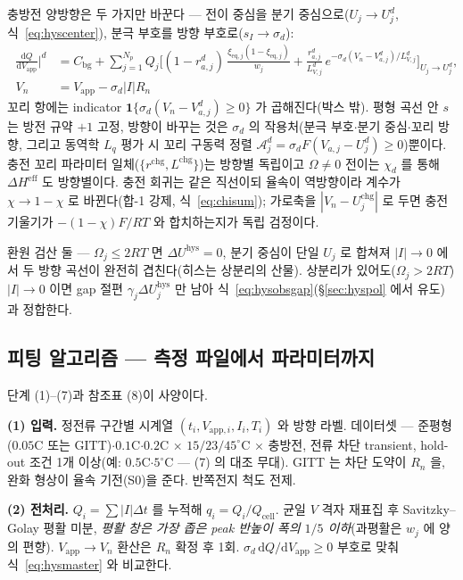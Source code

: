 \documentclass[11pt,a4paper]{article}
\newcommand{\dd}{\mathrm{d}}
\newcommand{\eff}{\mathrm{eff}}
\newcommand{\eq}{\mathrm{eq}}
\newcommand{\app}{\mathrm{app}}
\newcommand{\cell}{\mathrm{cell}}
\newcommand{\bg}{\mathrm{bg}}
\newcommand{\chg}{\mathrm{chg}}
\newcommand{\hys}{\mathrm{hys}}
\begin{document}
충방전 양방향은 두 가지만 바꾼다 — 전이 중심을 분기 중심으로($U_j\to U_j^{d}$, 식~\eqref{eq:hyscenter}), 분극 부호를 방향 부호로($s_I\to\sigma_d$):
\begin{equation}
\boxed{\;\begin{aligned}\frac{\dd Q}{\dd V_\app}\Big|^{d}&=C_\bg+\sum_{j=1}^{N_p}Q_j\bigg[
(1-r_{a,j}^d)\,\frac{\xi_{\eq,j}(1-\xi_{\eq,j})}{w_j}
+\frac{r_{a,j}^d}{L_{V,j}^d}\,e^{-\sigma_d(V_n-V_{a,j}^d)/L_{V,j}^d}\bigg]_{U_j\to U_j^{d}},\\[2pt]
V_n&=V_\app-\sigma_d|I|R_n\end{aligned}\;}
\label{eq:hysmaster}
\end{equation}
꼬리 항에는 indicator $\mathbf 1\{\sigma_d(V_n-V_{a,j}^d)\ge0\}$ 가 곱해진다(박스 밖). 평형 곡선 안 $s$ 는 방전 규약 $+1$ 고정, 방향이 바꾸는 것은 $\sigma_d$ 의 작용처(분극 부호$\cdot$분기 중심$\cdot$꼬리 방향, 그리고 동역학 $L_q$ 평가 시 꼬리 구동력 정렬 $\mathcal A_j^d=\sigma_d F(V_{a,j}-U_j^d)\ge0$)뿐이다. 충전 꼬리 파라미터 일체($\{r^{\chg},L^{\chg}\}$)는 방향별 독립이고 $\Omega\ne0$ 전이는 $\chi_d$ 를 통해 $\Delta H^{\eff}$ 도 방향별이다. 충전 회귀는 같은 직선이되 율속이 역방향이라 계수가 $\chi\to1-\chi$ 로 바뀐다(합-1 강제, 식~\eqref{eq:chisum}); 가로축을 $|V_n-U_j^{\chg}|$ 로 두면 충전 기울기가 $-(1-\chi)F/RT$ 와 합치하는지가 독립 검정이다.

환원 검산 둘 — $\Omega_j\le2RT$ 면 $\Delta U^\hys=0$, 분기 중심이 단일 $U_j$ 로 합쳐져 $|I|\to0$ 에서 두 방향 곡선이 완전히 겹친다(히스는 상분리의 산물). 상분리가 있어도($\Omega_j>2RT$) $|I|\to0$ 이면 gap 절편 $\gamma_j\Delta U_j^\hys$ 만 남아 식~\eqref{eq:hysobsgap}(\S\ref{sec:hyspol} 에서 유도) 과 정합한다.

\subsection{피팅 알고리즘 — 측정 파일에서 파라미터까지}
단계 (1)--(7)과 참조표 (8)이 사양이다.

\textbf{(1) 입력.} 정전류 구간별 시계열 $(t_i,V_{\app,i},I_i,T_i)$ 와 방향 라벨. 데이터셋 — 준평형($0.05$C 또는 GITT)$\cdot$$0.1$C$\cdot$$0.2$C $\times$ $15/23/45^\circ$C $\times$ 충방전, 전류 차단 transient, hold-out 조건 1개 이상(예: $0.5$C$\cdot$$5^\circ$C — (7) 의 대조 무대). GITT \cite{weppner1977}는 차단 도약이 $R_n$ 을, 완화 형상이 율속 기전(S0)을 준다. 반쪽전지 척도 전제.

\textbf{(2) 전처리.} $Q_i=\sum|I|\Delta t$ 를 누적해 $q_i=Q_i/Q_\cell$. 균일 $V$ 격자 재표집 후 Savitzky--Golay 평활 미분, \emph{평활 창은 가장 좁은 peak 반높이 폭의 $1/5$ 이하}(과평활은 $w_j$ 에 양의 편향). $V_\app\to V_n$ 환산은 $R_n$ 확정 후 1회. $\sigma_d\,\dd Q/\dd V_\app\ge0$ 부호로 맞춰 식~\eqref{eq:hysmaster} 와 비교한다.
\end{document}
